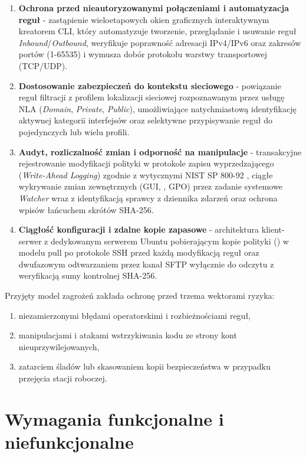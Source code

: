 \begin{enumerate}
    \item \textbf{Ochrona przed nieautoryzowanymi połączeniami i automatyzacja reguł} - zastąpienie wieloetapowych okien graficznych interaktywnym kreatorem CLI, który automatyzuje tworzenie, przeglądanie i usuwanie reguł \textit{Inbound}/\textit{Outbound}, weryfikuje poprawność adresacji IPv4/IPv6 oraz zakresów portów (1-65535) i wymusza dobór protokołu warstwy transportowej (TCP/UDP).
    \item \textbf{Dostosowanie zabezpieczeń do kontekstu sieciowego} - powiązanie reguł filtracji z profilem lokalizacji sieciowej rozpoznawanym przez usługę NLA (\textit{Domain}, \textit{Private}, \textit{Public}), umożliwiające natychmiastową identyfikację aktywnej kategorii interfejsów oraz selektywne przypisywanie reguł do pojedynczych lub wielu profili.
    \item \textbf{Audyt, rozliczalność zmian i odporność na manipulacje} - transakcyjne rejestrowanie modyfikacji polityki w protokole zapisu wyprzedzającego (\textit{Write-Ahead Logging}) zgodnie z wytycznymi NIST SP 800-92 \cite{nist-sp800-92}, ciągłe wykrywanie zmian zewnętrznych (GUI, , GPO) przez zadanie systemowe \textit{Watcher} wraz z identyfikacją sprawcy z dziennika zdarzeń oraz ochrona wpisów łańcuchem skrótów SHA-256.
    \item \textbf{Ciągłość konfiguracji i zdalne kopie zapasowe} - architektura klient-serwer z dedykowanym serwerem Ubuntu pobierającym kopie polityki () w modelu pull po protokole SSH przed każdą modyfikacją reguł oraz dwufazowym odtwarzaniem przez kanał SFTP wyłącznie do odczytu z weryfikacją sumy kontrolnej SHA-256.
\end{enumerate}

Przyjęty model zagrożeń zakłada ochronę przed trzema wektorami ryzyka:
\begin{enumerate}
    \item niezamierzonymi błędami operatorskimi i rozbieżnościami reguł,
    \item manipulacjami i atakami wstrzykiwania kodu ze strony kont nieuprzywilejowanych,
    \item zatarciem śladów lub skasowaniem kopii bezpieczeństwa w przypadku przejęcia stacji roboczej.
\end{enumerate}

\section{Wymagania funkcjonalne i niefunkcjonalne}\label{sec:wymagania}

